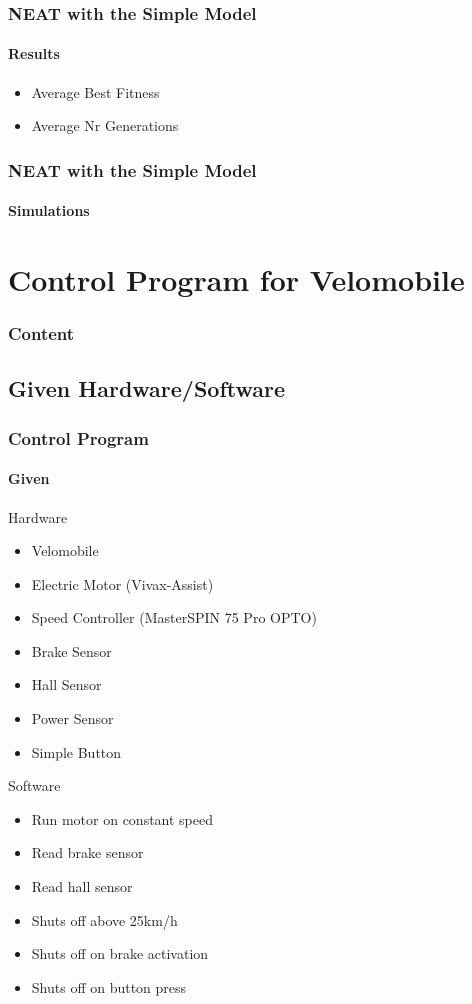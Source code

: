 \documentclass[8pt]{beamer}
\begin{document}
\begin{frame}
	\frametitle{NEAT with the Simple Model}
	\framesubtitle{Results}
	\begin{itemize}
		\item Average Best Fitness
		\item Average Nr Generations
	\end{itemize}
\end{frame}

\begin{frame}
	\frametitle{NEAT with the Simple Model}
	\framesubtitle{Simulations}
\end{frame}


\section{Control Program for Velomobile}
\begin{frame}
	\frametitle{Content}
\end{frame}

\subsection{Given Hardware/Software}
\begin{frame}
	\frametitle{Control Program}
	\framesubtitle{Given}
	\begin{block}{Hardware}
		\begin{itemize}
			\item Velomobile
			\item Electric Motor (Vivax-Assist)
			\item Speed Controller (MasterSPIN 75 Pro OPTO)
			\item Brake Sensor
			\item Hall Sensor
			\item Power Sensor
			\item Simple Button
		\end{itemize}
	\end{block}	
	\pause
	\begin{block}{Software}
		\begin{itemize}
			\item Run motor on constant speed
			\item Read brake sensor
			\item Read hall sensor
			\item Shuts off above 25km/h
			\item Shuts off on brake activation
			\item Shuts off on button press
		\end{itemize}
	\end{block}		
\end{frame}
\end{document}
